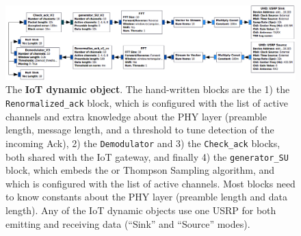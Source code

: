 \begin{figure}[!b]
	\centering
    \includegraphics[width=1.00\textwidth]{2-Chapters/4-Chapter/Images/USRP_TX_SU__v1__simple_grc.png}
    \caption{The \textbf{IoT dynamic object}. The hand-written blocks are the 1) the \texttt{Renormalized\_ack} block, which is configured with the list of active channels and extra knowledge about the PHY layer (preamble length, message length, and a threshold to tune detection of the incoming Ack), 2) the \texttt{Demodulator} and 3) the \texttt{Check\_ack} blocks, both shared with the IoT gateway, and finally 4) the \texttt{generator\_SU} block, which embeds the \UCB{} or Thompson Sampling algorithm, and which is configured with the list of active channels. Most blocks need to know constants about the PHY layer (preamble length and data length). Any of the IoT dynamic objects use one USRP for both emitting and receiving data (``Sink'' and ``Source'' modes).}
    \label{fig:4app:USRP_TX_SU__v1__simple_grc}
\end{figure}